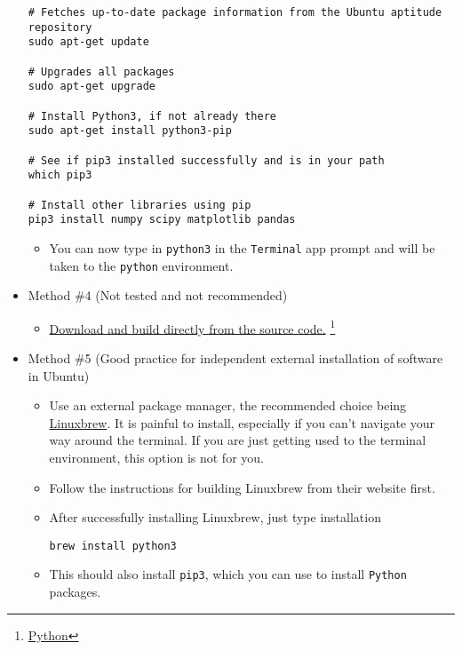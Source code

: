 \documentclass[11pt]{article}
\begin{document}
\begin{itemize}
\begin{verbatim}
# Fetches up-to-date package information from the Ubuntu aptitude repository
sudo apt-get update

# Upgrades all packages
sudo apt-get upgrade

# Install Python3, if not already there
sudo apt-get install python3-pip

# See if pip3 installed successfully and is in your path
which pip3

# Install other libraries using pip
pip3 install numpy scipy matplotlib pandas

\end{verbatim}
\begin{itemize}
\item You can now type in \texttt{python3} in the \texttt{Terminal} app prompt and will be taken
to the \texttt{python} environment.
\end{itemize}

\item Method \#4 (Not tested and not recommended)
\label{sec:org1e0bbd4}
\begin{itemize}
\item \href{https://www.python.org/downloads/source/}{Download and build directly from the source code.} \footnote{\href{https://www.python.org/}{Python}}
\end{itemize}
\item Method \#5 (Good practice for independent external installation of software in Ubuntu)
\label{sec:org63b5946}
\begin{itemize}
\item Use an external package manager, the recommended choice being \href{https://linuxbrew.sh/}{Linuxbrew}. It
is painful to install, especially if you can't navigate your way
around the terminal. If you are just getting used to the terminal
environment, this option is not for you.
\item Follow the instructions for building Linuxbrew from their website first.
\item After successfully installing Linuxbrew, just type installation
\begin{verbatim}
brew install python3
\end{verbatim}
\item This should also install \texttt{pip3}, which you can use to install \texttt{Python} packages.
\end{itemize}
\end{itemize}
\end{document}
